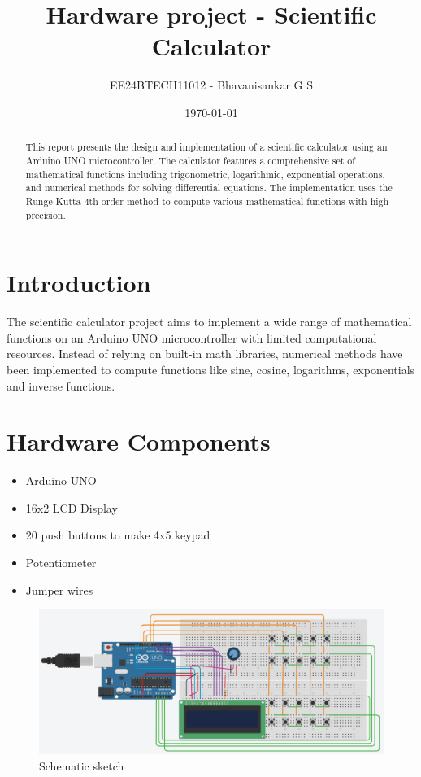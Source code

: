 \documentclass[12pt,a4paper]{article}
\title{\textbf{Hardware project - Scientific Calculator}}
\author{EE24BTECH11012 - Bhavanisankar G S}
\date{\today}
\begin{document}
\maketitle

\begin{abstract}
This report presents the design and implementation of a scientific calculator using an Arduino UNO microcontroller. The calculator features a comprehensive set of mathematical functions including trigonometric, logarithmic, exponential operations, and numerical methods for solving differential equations. The implementation uses the Runge-Kutta 4th order method to compute various mathematical functions with high precision.
\end{abstract}

\tableofcontents

\section{Introduction}
The scientific calculator project aims to implement a wide range of mathematical functions on an Arduino UNO microcontroller with limited computational resources. Instead of relying on built-in math libraries, numerical methods have been implemented to compute functions like sine, cosine, logarithms, exponentials and inverse functions.

\section{Hardware Components}
\begin{itemize}
    \item Arduino UNO
    \item 16x2 LCD Display
    \item 20 push buttons to make 4x5 keypad
    \item Potentiometer
    \item Jumper wires
\end{itemize}

\begin{figure}[H]
	\includegraphics[width=\columnwidth]{figs/schematic.png}
	\caption{Schematic sketch}
	\label{Schematic}
\end{figure}
\end{document}
